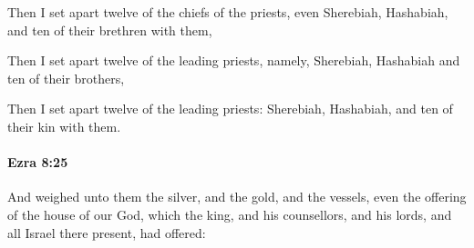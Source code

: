 			\begin{versebox}
					\item[BHS] 
					\item[LXX] 
					\item[ASV] Then I set apart twelve of the chiefs of the priests, even Sherebiah, Hashabiah, and ten of their brethren with them,
					\item[NIV] Then I set apart twelve of the leading priests, namely, Sherebiah, Hashabiah and ten of their brothers,
					\item[NRSV] Then I set apart twelve of the leading priests: Sherebiah, Hashabiah, and ten of their kin with them.
			\end{versebox}

		\paragraph{Ezra 8:25} %
			\label{EZRA-8-25}

			And weighed unto them the silver, and the gold, and the vessels, even the offering of the house of our God, which the king, and his counsellors, and his lords, and all Israel there present, had offered:

